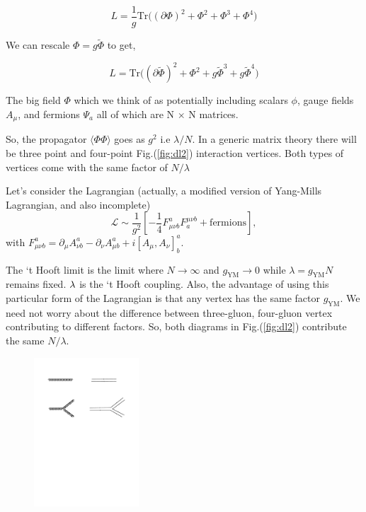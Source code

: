 \begin{equation}
L = \frac{1}{g} \mathrm{Tr} \Bigg( (\partial \Phi)^2 + \Phi^2 + \Phi^3 + \Phi^4  \Bigg) 
\end{equation} 

We can rescale $ \Phi = g \tilde{\Phi}$  to get, 

\begin{equation}
L = \mathrm{Tr} \Bigg( (\partial \tilde{\Phi})^2 + \Phi^2 + g \tilde{\Phi}^3 + g \tilde{\Phi}^4  \Bigg)
\end{equation} 

The big field $\Phi$ which we think of as potentially including scalars $\phi$, gauge fields $A_{\mu}$, and fermions $\Psi_{a}$  all of which are N $\times$ N matrices.

So, the propagator $\langle \Phi \Phi \rangle$ goes as $g^2$ i.e $\lambda/N$. In a generic matrix theory there will be three point and four-point Fig.(\ref{fig:dl2}) interaction
vertices. Both types of vertices come with the same factor of $N/\lambda$


Let's consider the Lagrangian (actually, a modified version of Yang-Mills Lagrangian, and also incomplete)
\begin{equation}
  \label{eq:action1}
  \mathscr{L} \sim  \frac{1}{g^2} \left [ -\frac{1}{4} F_{\mu\nu b}^{a}F^{\mu\nu b}_{a} + \text{fermions} \right]  ,
\end{equation}
with $F_{\mu\nu b}^{a} = \partial_{\mu} A^{a}_{\nu b} - \partial_{\nu} A^{a}_{\mu b} + i [A_{\mu}, A_{\nu}]^{a}_{b}$. 

The `t Hooft limit is the limit where $N \to \infty$ and $g_{\text{YM}} \to 0$ while $\lambda = g_{\text{YM}} N $ remains fixed. $\lambda$ is the 
`t Hooft coupling. Also, the advantage of using this particular form of the Lagrangian is that any vertex has the same factor $g_{\text{YM}}$. 
We need not worry about the difference between three-gluon, four-gluon vertex contributing to different factors. So, both diagrams in Fig.(\ref{fig:dl2})
contribute the same $N/\lambda$. 


\begin{figure}
\begin{center}\includegraphics[width=0.35\textwidth]{./Figures/DL1}\end{center}
\end{figure}


